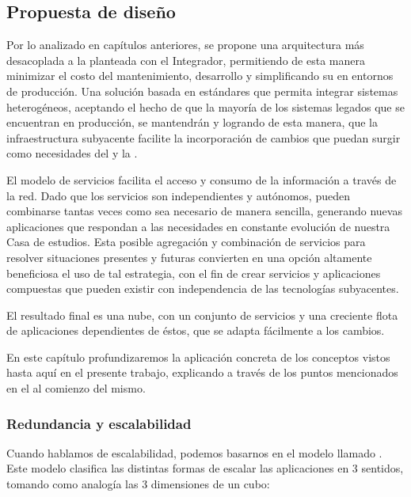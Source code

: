 \subsection{Propuesta de diseño}
\label{propuesta}

Por lo analizado en capítulos anteriores, se propone una arquitectura más desacoplada a la planteada con el Integrador, permitiendo de esta manera minimizar el costo del mantenimiento, desarrollo y simplificando su  en entornos de producción. Una solución basada en estándares que permita integrar sistemas heterogéneos, aceptando el hecho de que la mayoría de los sistemas legados que se encuentran en producción, se mantendrán y logrando de esta manera, que la infraestructura subyacente facilite la incorporación de cambios que puedan surgir como necesidades del {\cespi} y la {\unlp}.

El modelo de servicios facilita el acceso y consumo de la información a través de la red. Dado que los servicios son independientes y autónomos, pueden combinarse tantas veces como sea necesario de manera sencilla, generando nuevas aplicaciones que respondan a las necesidades en constante evolución de nuestra Casa de estudios. Esta posible agregación y combinación de servicios para resolver situaciones presentes y futuras convierten en una opción altamente beneficiosa el uso de tal estrategia, con el fin de crear servicios y aplicaciones compuestas que pueden existir con independencia de las tecnologías subyacentes\cite{microsoft2006}.

El resultado final es una nube, con un conjunto de servicios y una creciente flota de aplicaciones dependientes de éstos, que se adapta fácilmente a los cambios.

En este capítulo profundizaremos la aplicación concreta de los conceptos vistos hasta aquí en el presente trabajo, explicando a través de los puntos mencionados en el  al comienzo del mismo.


\subsubsection{Redundancia y escalabilidad}

Cuando hablamos de escalabilidad, podemos basarnos en el modelo llamado \cite{website:akfpartners-scale-cube}. Este modelo clasifica las distintas formas de escalar las aplicaciones en 3 sentidos, tomando como analogía las 3 dimensiones de un cubo:

